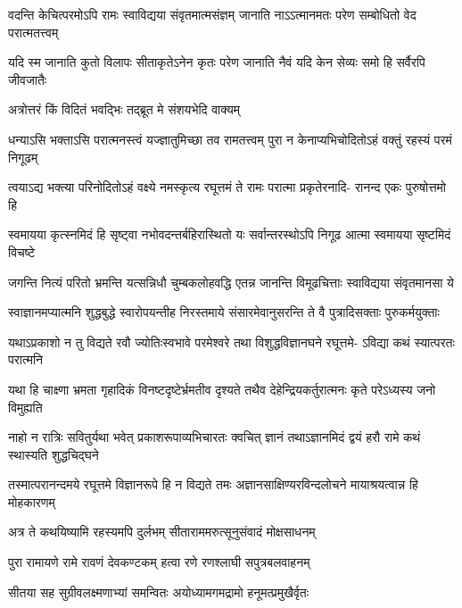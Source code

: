\fourlineindentedshloka
{वदन्ति केचित्परमोऽपि रामः}
{स्वाविद्यया संवृतमात्मसंज्ञम्}
{जानाति नाऽऽत्मानमतः परेण}
{सम्बोधितो वेद परात्मतत्त्वम्} %

\fourlineindentedshloka
{यदि स्म जानाति कुतो विलापः}
{सीताकृतेऽनेन कृतः परेण}
{जानाति नैवं यदि केन सेव्यः}
{समो हि सर्वैरपि जीवजातैः} %

\twolineshloka
{अत्रोत्तरं किं विदितं भवद्भिः}
{तद्ब्रूत मे संशयभेदि वाक्यम्} %


\fourlineindentedshloka
{धन्याऽसि भक्ताऽसि परात्मनस्त्वं}
{यज्ज्ञातुमिच्छा तव रामतत्त्वम्}
{पुरा न केनाप्यभिचोदितोऽहं}
{वक्तुं रहस्यं परमं निगूढम्} %

\fourlineindentedshloka
{त्वयाऽद्य भक्त्या परिनोदितोऽहं}
{वक्ष्ये नमस्कृत्य रघूत्तमं ते}
{रामः परात्मा प्रकृतेरनादि-}
{रानन्द एकः पुरुषोत्तमो हि} %

\fourlineindentedshloka
{स्वमायया कृत्स्नमिदं हि सृष्ट्वा}
{नभोवदन्तर्बहिरास्थितो यः}
{सर्वान्तरस्थोऽपि निगूढ आत्मा}
{स्वमायया सृष्टमिदं विचष्टे} %

\fourlineindentedshloka
{जगन्ति नित्यं परितो भ्रमन्ति}
{यत्सन्निधौ चुम्बकलोहवद्धि}
{एतन्न जानन्ति विमूढचित्ताः}
{स्वाविद्यया संवृतमानसा ये} %

\fourlineindentedshloka
{स्वाज्ञानमप्यात्मनि शुद्धबुद्धे}
{स्वारोपयन्तीह निरस्तमाये}
{संसारमेवानुसरन्ति ते वै}
{पुत्रादिसक्ताः पुरुकर्मयुक्ताः} %

\fourlineindentedshloka
{यथाऽप्रकाशो न तु विद्यते रवौ}
{ज्योतिःस्वभावे परमेश्वरे तथा}
{विशुद्धविज्ञानघने रघूत्तमे-}
{ऽविद्या कथं स्यात्परतः परात्मनि} %

\fourlineindentedshloka
{यथा हि चाक्ष्णा भ्रमता गृहादिकं}
{विनष्टदृष्टेर्भ्रमतीव दृश्यते}
{तथैव देहेन्द्रियकर्तुरात्मनः}
{कृते परेऽध्यस्य जनो विमुह्यति} %

\fourlineindentedshloka
{नाहो न रात्रिः सवितुर्यथा भवेत्}
{प्रकाशरूपाव्यभिचारतः क्वचित्}
{ज्ञानं तथाऽज्ञानमिदं द्वयं हरौ}
{रामे कथं स्थास्यति शुद्धचिद्घने} %

\fourlineindentedshloka
{तस्मात्परानन्दमये रघूत्तमे}
{विज्ञानरूपे हि न विद्यते तमः}
{अज्ञानसाक्षिण्यरविन्दलोचने}
{मायाश्रयत्वान्न हि मोहकारणम्} %

\twolineshloka
{अत्र ते कथयिष्यामि रहस्यमपि दुर्लभम्}
{सीताराममरुत्सूनुसंवादं मोक्षसाधनम्} %

\twolineshloka
{पुरा रामायणे रामे रावणं देवकण्टकम्}
{हत्वा रणे रणश्लाघी सपुत्रबलवाहनम्} %

\twolineshloka
{सीतया सह सुग्रीवलक्ष्मणाभ्यां समन्वितः}
{अयोध्यामगमद्रामो हनूमत्प्रमुखैर्वृतः} %

